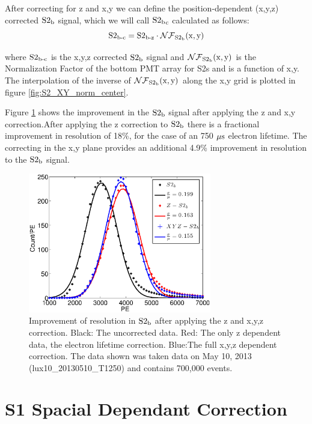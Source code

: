 After correcting for z and x,y we can define the position-dependent  (x,y,z) corrected $\rm S2_b$ signal, which we will call $\rm S2{_b}_c$ calculated as follows:
\begin{equation}
\rm S2_{\operatorname{b-c}}=S2_{\operatorname{b-z}} \cdot \mathcal{NF}_{S2_b}(x,y) %
\label{eq:S2_XYZ}
\end{equation}

\noindent where $\rm S2_{\operatorname{b-c}}$ is the x,y,z corrected $\rm S2_b$ signal and $\rm \mathcal{NF}_{S2_b}(x,y)$ is the Normalization Factor of the bottom PMT array for S2s and is a function of x,y. The interpolation of the inverse of $\rm \mathcal{NF}_{S2_b}(x,y)$ along the x,y grid is plotted in figure \ref{fig:S2_XY_norm_center}.


Figure \ref{fig:S2_res} shows the improvement in the $\rm S2_b$ signal after applying the z and x,y correction.After applying the z correction to $\rm S2_b$ there is a fractional improvement in resolution of 18\%, for the case of an 750 $\rm \mu s$ electron lifetime. The correcting in the x,y plane provides an additional 4.9\% improvement in resolution to the $\rm S2_b$ signal. 

\renewcommand{\baselinestretch}{1}
\small\normalsize
\begin{figure}[h!]\centering
\includegraphics[width=80mm]{Chapter_XYZ_Corr/Thesis_Corr_Plots/S2_corr_res.eps}
\caption{Improvement of resolution in $\rm S2_b$ after applying the z and x,y,z correction. Black: The uncorrected data. Red: The only z dependent data, the electron lifetime correction. Blue:The full x,y,z dependent correction. The data shown was taken data on May 10, 2013 (lux10\_20130510\_T1250) and contains 700,000 \KrCal events.}
\label{fig:S2_res}
\end{figure}
\renewcommand{\baselinestretch}{2}
\small\normalsize

\section{S1 Spacial Dependant Correction}

